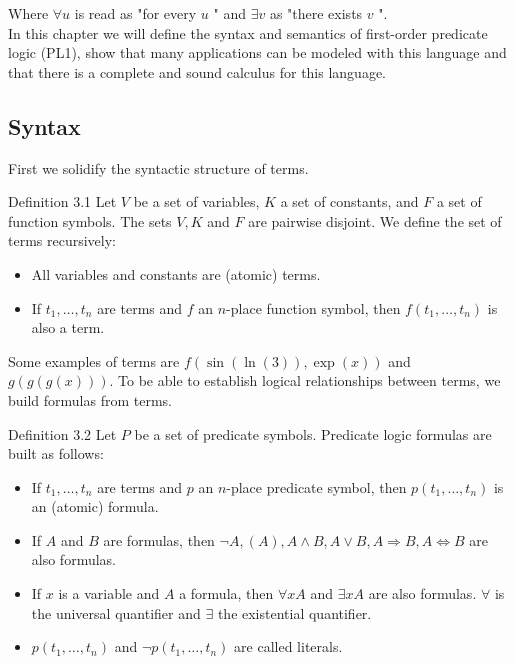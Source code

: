 \documentclass[10pt]{book}
\begin{document}
Where $\forall u$ is read as "for every $u$ " and $\exists v$ as "there exists $v$ ".\\
In this chapter we will define the syntax and semantics of first-order predicate logic (PL1), show that many applications can be modeled with this language and that there is a complete and sound calculus for this language.

\subsection*{Syntax}
First we solidify the syntactic structure of terms.

Definition 3.1 Let $V$ be a set of variables, $K$ a set of constants, and $F$ a set of function symbols. The sets $V, K$ and $F$ are pairwise disjoint. We define the set of terms recursively:

\begin{itemize}
  \item All variables and constants are (atomic) terms.
  \item If $t_{1}, \ldots, t_{n}$ are terms and $f$ an $n$-place function symbol, then $f\left(t_{1}, \ldots, t_{n}\right)$ is also a term.
\end{itemize}

Some examples of terms are $f(\sin (\ln (3)), \exp (x))$ and $g(g(g(x)))$. To be able to establish logical relationships between terms, we build formulas from terms.

Definition 3.2 Let $P$ be a set of predicate symbols. Predicate logic formulas are built as follows:

\begin{itemize}
  \item If $t_{1}, \ldots, t_{n}$ are terms and $p$ an $n$-place predicate symbol, then $p\left(t_{1}, \ldots, t_{n}\right)$ is an (atomic) formula.
  \item If $A$ and $B$ are formulas, then $\neg A,(A), A \wedge B, A \vee B, A \Rightarrow B, A \Leftrightarrow B$ are also formulas.
  \item If $x$ is a variable and $A$ a formula, then $\forall x A$ and $\exists x A$ are also formulas. $\forall$ is the universal quantifier and $\exists$ the existential quantifier.
  \item $p\left(t_{1}, \ldots, t_{n}\right)$ and $\neg p\left(t_{1}, \ldots, t_{n}\right)$ are called literals.
\end{itemize}
\end{document}

